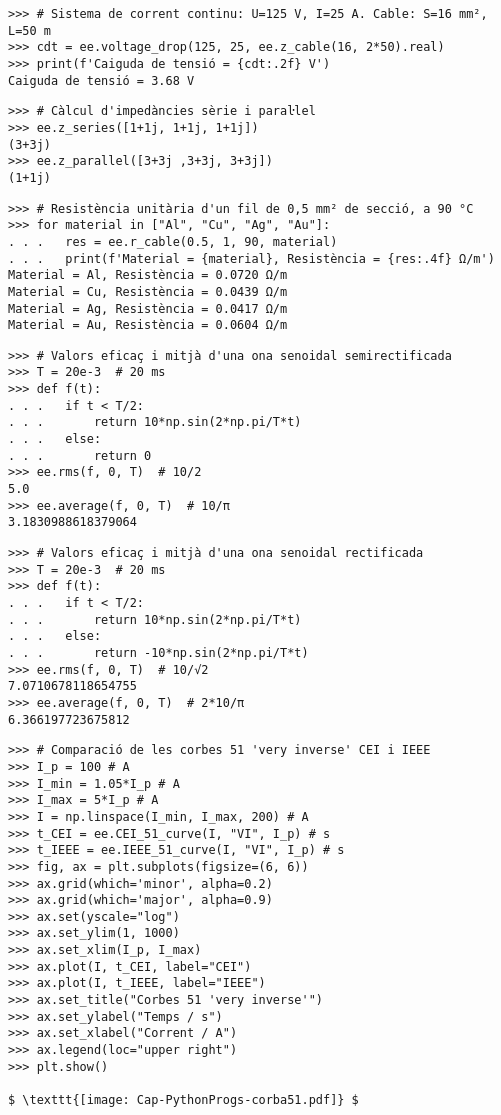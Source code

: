 \begin{lstlisting}
>>> # Sistema de corrent continu: U=125 V, I=25 A. Cable: S=16 mm², L=50 m
>>> cdt = ee.voltage_drop(125, 25, ee.z_cable(16, 2*50).real)
>>> print(f'Caiguda de tensió = {cdt:.2f} V')
Caiguda de tensió = 3.68 V
\end{lstlisting}

	
\begin{lstlisting}
>>> # Càlcul d'impedàncies sèrie i paraŀlel
>>> ee.z_series([1+1j, 1+1j, 1+1j])
(3+3j)
>>> ee.z_parallel([3+3j ,3+3j, 3+3j])
(1+1j)
\end{lstlisting}

\begin{lstlisting}
>>> # Resistència unitària d'un fil de 0,5 mm² de secció, a 90 °C 
>>> for material in ["Al", "Cu", "Ag", "Au"]:
. . .   res = ee.r_cable(0.5, 1, 90, material)
. . .   print(f'Material = {material}, Resistència = {res:.4f} Ω/m')
Material = Al, Resistència = 0.0720 Ω/m
Material = Cu, Resistència = 0.0439 Ω/m
Material = Ag, Resistència = 0.0417 Ω/m
Material = Au, Resistència = 0.0604 Ω/m        
\end{lstlisting}

\begin{lstlisting}
>>> # Valors eficaç i mitjà d'una ona senoidal semirectificada
>>> T = 20e-3  # 20 ms
>>> def f(t):
. . .   if t < T/2:
. . .       return 10*np.sin(2*np.pi/T*t)
. . .   else:
. . .       return 0
>>> ee.rms(f, 0, T)  # 10/2
5.0
>>> ee.average(f, 0, T)  # 10/π
3.1830988618379064
\end{lstlisting}

\begin{lstlisting}
>>> # Valors eficaç i mitjà d'una ona senoidal rectificada
>>> T = 20e-3  # 20 ms
>>> def f(t):
. . .   if t < T/2:
. . .       return 10*np.sin(2*np.pi/T*t)
. . .   else:
. . .       return -10*np.sin(2*np.pi/T*t)
>>> ee.rms(f, 0, T)  # 10/√2
7.0710678118654755
>>> ee.average(f, 0, T)  # 2*10/π
6.366197723675812
\end{lstlisting}

\begin{lstlisting}[mathescape=true]
>>> # Comparació de les corbes 51 'very inverse' CEI i IEEE
>>> I_p = 100 # A
>>> I_min = 1.05*I_p # A
>>> I_max = 5*I_p # A
>>> I = np.linspace(I_min, I_max, 200) # A
>>> t_CEI = ee.CEI_51_curve(I, "VI", I_p) # s   
>>> t_IEEE = ee.IEEE_51_curve(I, "VI", I_p) # s      
>>> fig, ax = plt.subplots(figsize=(6, 6))
>>> ax.grid(which='minor', alpha=0.2)
>>> ax.grid(which='major', alpha=0.9)
>>> ax.set(yscale="log")
>>> ax.set_ylim(1, 1000)
>>> ax.set_xlim(I_p, I_max)
>>> ax.plot(I, t_CEI, label="CEI")
>>> ax.plot(I, t_IEEE, label="IEEE")
>>> ax.set_title("Corbes 51 'very inverse'")
>>> ax.set_ylabel("Temps / s")
>>> ax.set_xlabel("Corrent / A")
>>> ax.legend(loc="upper right")
>>> plt.show()

$ \texttt{[image: Cap-PythonProgs-corba51.pdf]} $
\end{lstlisting}






